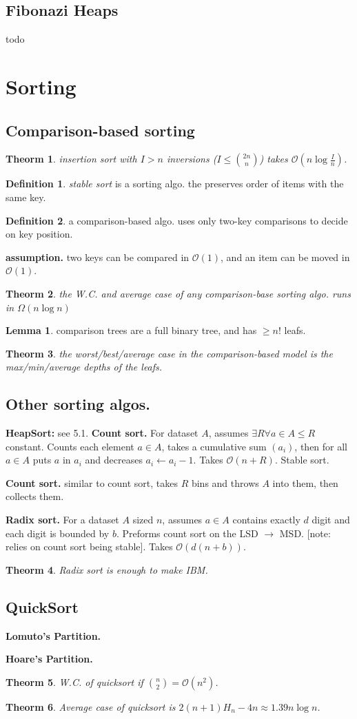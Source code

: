 \documentclass[]{article}
\newcommand\compactsubsection[1]        {\vspace{-10pt}\subsection{#1}\vspace{-5pt}}
\newcommand\compactsection   [1]        {\vspace{-10pt}\section{#1}\vspace{-5pt}}
\newcommand\subsectionrightaftersection {\vspace{10pt}}
\newcommand\oc    {\mathcal{O}}
\newcommand\logn      {\log n}
\newcommand\cl [1]    {\left ( #1 \right )}
\newtheorem{Theorem}{Theorm}
\theoremstyle{definition}
\newtheorem{Definition}{Definition}
\newtheorem{Lemma}{Lemma}
\newcommand\theo  [1] {\begin{Theorem}#1\end{Theorem}}
\newcommand\defi  [1] {\begin{Definition}#1\end{Definition}}
\newcommand\lem   [1] {\begin{Lemma}#1\end{Lemma}}
\begin{document}
\begin{multicols}{4}
			\compactsubsection{Fibonazi Heaps}
			todo
			
		
		
		\compactsection{Sorting}\subsectionrightaftersection
			\compactsubsection{Comparison-based sorting}
				\theo{insertion sort with $I > n$ inversions ($I \le \binom{2n}{n}$) takes $\oc\cl{n \log \frac{I}{n}}$. }
				\defi{\textit{stable sort} is a sorting algo. the preserves order of items with the same key. }
				\defi{a comparison-based algo. uses only two-key comparisons to decide on key position. }
				\textbf{assumption. }two keys can be compared in $\oc(1)$, and an item can be moved in $\oc(1)$. 
				\theo{the W.C. and average case of any comparison-base sorting algo. runs in $\Omega(n \logn)$}
				\lem{comparison trees are a full binary tree, and has $\ge n!$ leafs. }
				\theo{the worst/best/average case in the comparison-based model is the max/min/average depths of the leafs. }
			\compactsubsection{Other sorting algos. }
				\textbf{HeapSort: }see 5.1. 
				\textbf{Count sort. }For dataset $A$, assumes $\exists R \forall a \in A \le R$ constant. Counts each element $a \in A$, takes a cumulative sum $(a_i)$, then for all $a \in A$ puts $a$ in $a_i$ and decreases $a_i \gets a_i - 1$. Takes $\oc(n + R)$. Stable sort. 
				
				\textbf{Count sort. }similar to count sort, takes $R$ bins and throws $A$ into them, then collects them. 
				
				\textbf{Radix sort. }For a dataset $A$ sized $n$, assumes $a \in A$ contains exactly $d$ digit and each digit is bounded by $b$. Preforms count sort on the LSD $\to$ MSD. [note: relies on count sort being stable]. Takes $\oc(d(n + b))$. 
				
				\theo{Radix sort is enough to make IBM. }
							\compactsubsection{QuickSort}
				\textbf{Lomuto's Partition. }%
				
				\textbf{Hoare's Partition. }%
				
				\theo{W.C. of quicksort if $\binom{n}{2} = \oc(n^2)$. }
				\theo{Average case of quicksort is $2(n + 1)H_n - 4n \approx 1.39n\logn$. }
		

\end{multicols}
\end{document}
